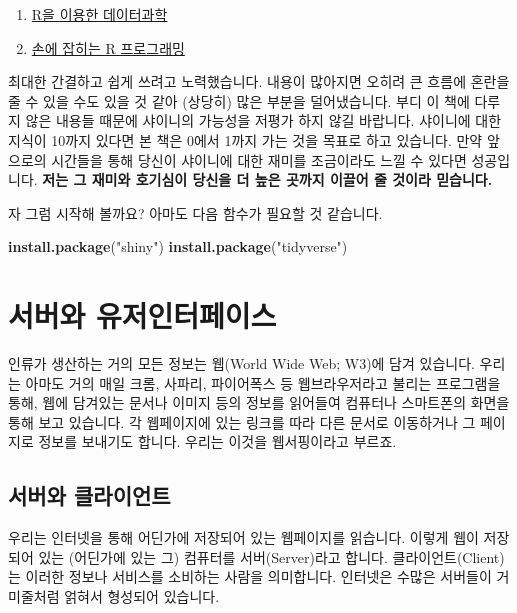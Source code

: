 \documentclass[]{book}
\newenvironment{Shaded}{\begin{snugshade}}{\end{snugshade}}
\newcommand{\KeywordTok}[1]{\textcolor[rgb]{0.13,0.29,0.53}{\textbf{#1}}}
\newcommand{\StringTok}[1]{\textcolor[rgb]{0.31,0.60,0.02}{#1}}
\newcommand{\NormalTok}[1]{#1}
\providecommand{\tightlist}{%
  \setlength{\itemsep}{0pt}\setlength{\parskip}{0pt}}
\begin{document}
\begin{enumerate}
\def\labelenumi{\arabic{enumi}.}
\tightlist
\item
  \href{https://r4ds.had.co.nz/}{R을 이용한 데이터과학}
\item
  \href{https://rstudio-education.github.io/hopr/}{손에 잡히는 R
  프로그래밍}
\end{enumerate}

최대한 간결하고 쉽게 쓰려고 노력했습니다. 내용이 많아지면 오히려 큰
흐름에 혼란을 줄 수 있을 수도 있을 것 같아 (상당히) 많은 부분을
덜어냈습니다. 부디 이 책에 다루지 않은 내용들 때문에 샤이니의 가능성을
저평가 하지 않길 바랍니다. 샤이니에 대한 지식이 10까지 있다면 본 책은
0에서 1까지 가는 것을 목표로 하고 있습니다. 만약 앞으로의 시간들을 통해
당신이 샤이니에 대한 재미를 조금이라도 느낄 수 있다면 성공입니다.
\textbf{저는 그 재미와 호기심이 당신을 더 높은 곳까지 이끌어 줄 것이라
믿습니다.}

자 그럼 시작해 볼까요? 아마도 다음 함수가 필요할 것 같습니다.

\begin{Shaded}
\begin{Highlighting}[]
\KeywordTok{install.package}\NormalTok{(}\StringTok{"shiny"}\NormalTok{)}
\KeywordTok{install.package}\NormalTok{(}\StringTok{"tidyverse"}\NormalTok{)}
\end{Highlighting}
\end{Shaded}

\chapter{서버와 유저인터페이스}\label{web}

인류가 생산하는 거의 모든 정보는 웹(World Wide Web; W3)에 담겨 있습니다.
우리는 아마도 거의 매일 크롬, 사파리, 파이어폭스 등 웹브라우저라고
불리는 프로그램을 통해, 웹에 담겨있는 문서나 이미지 등의 정보를 읽어들여
컴퓨터나 스마트폰의 화면을 통해 보고 있습니다. 각 웹페이지에 있는 링크를
따라 다른 문서로 이동하거나 그 페이지로 정보를 보내기도 합니다. 우리는
이것을 웹서핑이라고 부르죠.

\section{서버와 클라이언트}\label{-}

우리는 인터넷을 통해 어딘가에 저장되어 있는 웹페이지를 읽습니다. 이렇게
웹이 저장되어 있는 (어딘가에 있는 그) 컴퓨터를 서버(Server)라고 합니다.
클라이언트(Client)는 이러한 정보나 서비스를 소비하는 사람을 의미합니다.
인터넷은 수많은 서버들이 거미줄처럼 얽혀서 형성되어 있습니다.
\end{document}
